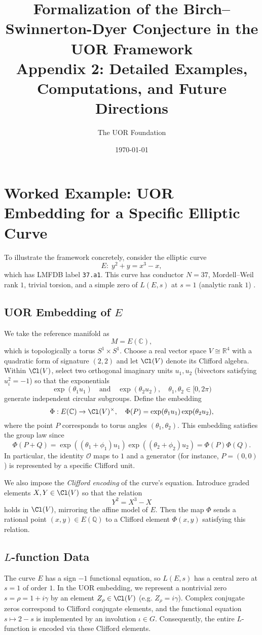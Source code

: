 \documentclass[11pt]{article}
\title{Formalization of the Birch--Swinnerton-Dyer Conjecture in the UOR Framework \\ Appendix 2: Detailed Examples, Computations, and Future Directions}
\author{The UOR Foundation}
\date{\today}
\begin{document}
\maketitle

\section{Worked Example: UOR Embedding for a Specific Elliptic Curve}

To illustrate the framework concretely, consider the elliptic curve 
\[
E: \; y^2 + y = x^3 - x,
\]
which has LMFDB label \texttt{37.a1}. This curve has conductor \(N=37\), Mordell--Weil rank \(1\), trivial torsion, and a simple zero of \(L(E,s)\) at \(s=1\) (analytic rank \(1\)) \cite{LMFDB1,LMFDB2}. 

\subsection*{UOR Embedding of \(E\)}
We take the reference manifold as 
\[
M = E(\mathbb{C}),
\]
which is topologically a torus \(S^1 \times S^1\). Choose a real vector space \(V \cong \mathbb{R}^4\) with a quadratic form of signature \((2,2)\) and let \(\Cl(V)\) denote its Clifford algebra. Within \(\Cl(V)\), select two orthogonal imaginary units \(u_1,u_2\) (bivectors satisfying \(u_i^2=-1\)) so that the exponentials
\[
\exp(\theta_1 u_1) \quad \text{and} \quad \exp(\theta_2 u_2),\quad \theta_1,\theta_2\in [0,2\pi)
\]
generate independent circular subgroups. Define the embedding
\[
\Phi: E(\mathbb{C}) \to \Cl(V)^\times,\quad \Phi(P)=\exp(\theta_1 u_1)\exp(\theta_2 u_2),
\]
where the point \(P\) corresponds to torus angles \((\theta_1,\theta_2)\). This embedding satisfies the group law since
\[
\Phi(P+Q)=\exp((\theta_1+\phi_1) u_1)\exp((\theta_2+\phi_2) u_2)=\Phi(P)\Phi(Q).
\]
In particular, the identity \(\mathcal{O}\) maps to \(1\) and a generator (for instance, \(P=(0,0)\)) is represented by a specific Clifford unit.

We also impose the \emph{Clifford encoding} of the curve’s equation. Introduce graded elements \(X,Y\in\Cl(V)\) so that the relation 
\[
Y^2 = X^3 - X
\]
holds in \(\Cl(V)\), mirroring the affine model of \(E\). Then the map \(\Phi\) sends a rational point \((x,y) \in E(\mathbb{Q})\) to a Clifford element \(\Phi(x,y)\) satisfying this relation.

\subsection*{\(L\)-function Data}
The curve \(E\) has a sign \(-1\) functional equation, so \(L(E,s)\) has a central zero at \(s=1\) of order \(1\). In the UOR embedding, we represent a nontrivial zero \(s=\rho=1+i\gamma\) by an element \(Z_\rho\in\Cl(V)\) (e.g. \(Z_\rho=i\gamma\)). Complex conjugate zeros correspond to Clifford conjugate elements, and the functional equation \(s\mapsto 2-s\) is implemented by an involution \(\iota\in G\). Consequently, the entire \(L\)-function is encoded via these Clifford elements.
\end{document}
